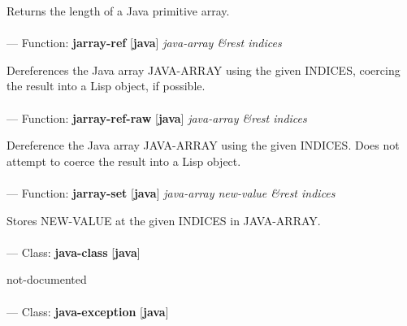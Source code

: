 \begin{adjustwidth}{5em}{5em}
Returns the length of a Java primitive array.
\end{adjustwidth}

\paragraph{}
\label{JAVA:JARRAY-REF}
--- Function: \textbf{jarray-ref} [\textbf{java}] \textit{java-array \&rest indices}

\begin{adjustwidth}{5em}{5em}
Dereferences the Java array JAVA-ARRAY using the given INDICES, coercing the result into a Lisp object, if possible.
\end{adjustwidth}

\paragraph{}
\label{JAVA:JARRAY-REF-RAW}
--- Function: \textbf{jarray-ref-raw} [\textbf{java}] \textit{java-array \&rest indices}

\begin{adjustwidth}{5em}{5em}
Dereference the Java array JAVA-ARRAY using the given INDICES. Does not attempt to coerce the result into a Lisp object.
\end{adjustwidth}

\paragraph{}
\label{JAVA:JARRAY-SET}
--- Function: \textbf{jarray-set} [\textbf{java}] \textit{java-array new-value \&rest indices}

\begin{adjustwidth}{5em}{5em}
Stores NEW-VALUE at the given INDICES in JAVA-ARRAY.
\end{adjustwidth}

\paragraph{}
\label{JAVA:JAVA-CLASS}
--- Class: \textbf{java-class} [\textbf{java}] \textit{}

\begin{adjustwidth}{5em}{5em}
not-documented
\end{adjustwidth}

\paragraph{}
\label{JAVA:JAVA-EXCEPTION}
--- Class: \textbf{java-exception} [\textbf{java}] \textit{}


